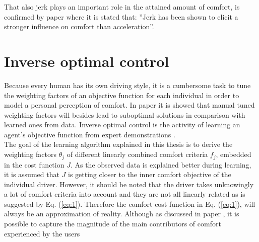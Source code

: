 That also jerk plays an important role in the attained amount of comfort, is confirmed by paper \cite{Gianna1996} where it is stated that: ''Jerk has been shown to elicit a stronger influence on comfort than acceleration''.




\section{Inverse optimal control}
\label{s:inverse re le}
Because every human has its own driving style, it is a cumbersome task to tune the weighting factors of an objective function for each individual in order to model a personal perception of comfort. In paper \cite{Powers} it is showed that manual tuned weighting factors will besides lead  to suboptimal solutions in comparison with learned ones from data. 
Inverse optimal control is the activity of learning an agent's objective function from expert demonstrations \cite{Arenz2017}.\\

The goal of the learning algorithm explained in this thesis is to derive the weighting factors $\theta_j$ of different linearly combined comfort criteria $f_j$, embedded in the cost function $J$. As the observed data is explained better during learning, it is assumed that $J$ is getting closer to the inner comfort objective of the individual driver. However, it should be noted that the driver takes unknowingly a lot of comfort criteria into account and they are not all linearly related as is suggested by Eq. (\ref{eq:1}). Therefore the comfort cost function in Eq. (\ref{eq:1}), will always be an approximation of reality. Although as discussed in paper \cite{Kuderer2015a}, it is possible to capture the magnitude of the main contributors of comfort experienced by the users\\

